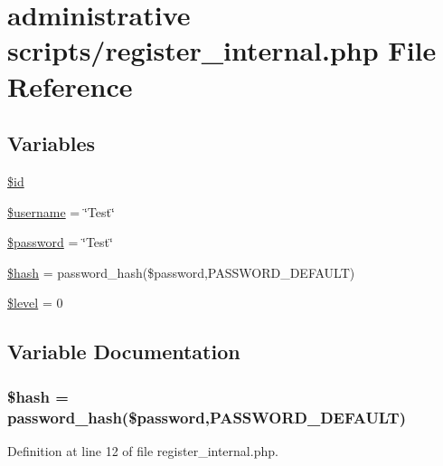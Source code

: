 \hypertarget{register__internal_8php}{}\section{administrative scripts/register\+\_\+internal.php File Reference}
\label{register__internal_8php}
\subsection*{Variables}
\begin{DoxyCompactItemize}
\item 
\hyperlink{register__internal_8php_ae97941710d863131c700f069b109991e}{\$id}
\item 
\hyperlink{register__internal_8php_a0eb82aa5f81cf845de4b36cd653c42cf}{\$username} = \char`\"{}Test\char`\"{}
\item 
\hyperlink{register__internal_8php_a607686ef9f99ea7c42f4f3dd3dbb2b0d}{\$password} = \char`\"{}Test\char`\"{}
\item 
\hyperlink{register__internal_8php_ac9fdf6f2c8fb45c1d3bb9a176802b2ad}{\$hash} = password\+\_\+hash(\$password,P\+A\+S\+S\+W\+O\+R\+D\+\_\+\+D\+E\+F\+A\+U\+LT)
\item 
\hyperlink{register__internal_8php_abd32cc82c6a3f79491987de36ad580ca}{\$level} = 0
\end{DoxyCompactItemize}


\subsection{Variable Documentation}
\subsubsection[{\texorpdfstring{\$hash}{$hash}}]{\setlength{\rightskip}{0pt plus 5cm}\$hash = password\+\_\+hash(\$password,P\+A\+S\+S\+W\+O\+R\+D\+\_\+\+D\+E\+F\+A\+U\+LT)}\hypertarget{register__internal_8php_ac9fdf6f2c8fb45c1d3bb9a176802b2ad}{}\label{register__internal_8php_ac9fdf6f2c8fb45c1d3bb9a176802b2ad}


Definition at line 12 of file register\+\_\+internal.\+php.


